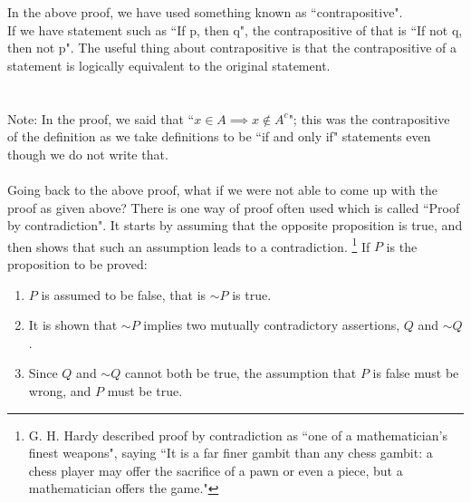 In the above proof, we have used something known as ``contrapositive".\\
If we have statement such as ``If p, then q", the contrapositive of that is ``If not q, then not p". The useful thing about contrapositive is that the contrapositive of a statement is logically equivalent to the original statement.\\
\\~\\
Note: In the proof, we said that ``$x \in A \implies x \not\in A^c$"; this was the contrapositive of the definition as we take definitions to be ``if and only if" statements even though we do not write that.\\~\\
Going back to the above proof, what if we were not able to come up with the proof as given above? There is one way of proof often used which is called ``Proof by contradiction".  It starts by assuming that the opposite proposition is true, and then shows that such an assumption leads to a contradiction.%
\footnote{G. H. Hardy described proof by contradiction as ``one of a mathematician's finest weapons", saying ``It is a far finer gambit than any chess gambit: a chess player may offer the sacrifice of a pawn or even a piece, but a mathematician offers the game."}
If $P$ is the proposition to be proved:
\begin{enumerate}
    \itemsep0em
    \item $P$ is assumed to be false, that is $\sim P$ is true.
    \item It is shown that $\sim P$ implies  two mutually contradictory assertions, $Q$ and $\sim Q$.
    \item Since $Q$ and $\sim Q$ cannot both be true, the assumption that $P$ is false must be wrong, and $P$ must be true.
\end{enumerate}

